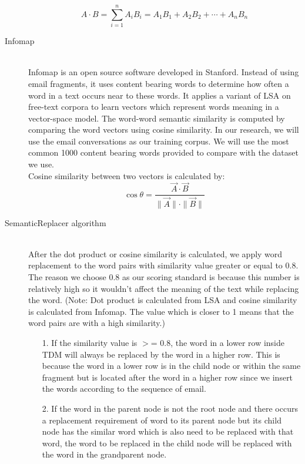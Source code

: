 \documentclass[a4paper, 12pt]{article}
\begin{document}
\begin{description}
		\begin{equation}
			A \cdot B = \sum_{i=1}^n A_iB_i = A_1B_1 + A_2B_2 + \cdots + A_nB_n
		\end{equation}
		
	\item[Infomap]\hfill \\
		Infomap is an open source software developed in Stanford. \cite{stanford2007} Instead of using email fragments, it uses content bearing words to determine how often a word in a text occurs near to these words. It applies a variant of LSA on free-text corpora to learn vectors which represent words meaning in a vector-space model. The word-word semantic similarity is computed by comparing the word vectors using cosine similarity. In our research, we will use the email conversations as our training corpus. We will use the most common 1000 content bearing words provided to compare with the dataset we use. \\ 
		
		Cosine similarity between two vectors is calculated by: \\
		\begin{equation}
			\cos \theta = \frac{\overrightarrow{A} \cdot \overrightarrow{B}}{\|\overrightarrow{A}\|\cdot\|\overrightarrow{B}\|}
		\end{equation}
		

	\item[SemanticReplacer algorithm]\hfill \\
		After the dot product or cosine similarity is calculated, we apply word replacement to the word pairs with similarity value greater or equal to 0.8. The reason we choose 0.8 as our scoring standard is because this number is relatively high so it wouldn't affect the meaning of the text while replacing the word. (Note: Dot product is calculated from LSA and cosine similarity is calculated from Infomap. The value which is closer to 1 means that the word pairs are with a  high similarity.)

\begin{itemize}
	\item[1.] If the similarity value is $>$= 0.8, the word in a lower row inside TDM will always be replaced by the word in a higher row. This is because the word in a lower row is in the child node or within the same fragment but is located after the word in a higher row since we insert the words according to the sequence of email. 

	\item[2.] If the word in the parent node is not the root node and there occurs a replacement requirement of word to its parent node but its child node has the similar word which is also need to be replaced with that word, the word to be replaced in the child node will be replaced with the word in the grandparent node. 
\end{itemize}


\end{description}
\end{document}
